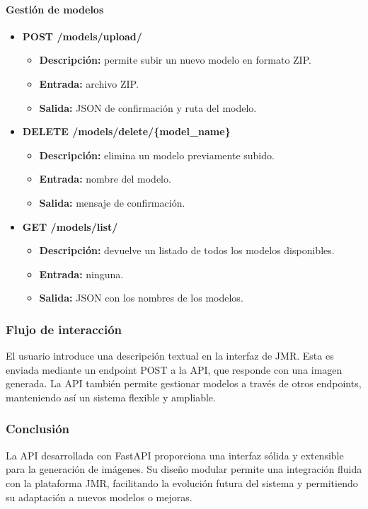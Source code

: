 \paragraph{Gestión de modelos}
\begin{itemize}
    \item \textbf{POST /models/upload/}
    \begin{itemize}
        \item \textbf{Descripción:} permite subir un nuevo modelo en formato ZIP.
        \item \textbf{Entrada:} archivo ZIP.
        \item \textbf{Salida:} JSON de confirmación y ruta del modelo.
    \end{itemize}

    \item \textbf{DELETE /models/delete/\{model\_name\}}
    \begin{itemize}
        \item \textbf{Descripción:} elimina un modelo previamente subido.
        \item \textbf{Entrada:} nombre del modelo.
        \item \textbf{Salida:} mensaje de confirmación.
    \end{itemize}

    \item \textbf{GET /models/list/}
    \begin{itemize}
        \item \textbf{Descripción:} devuelve un listado de todos los modelos disponibles.
        \item \textbf{Entrada:} ninguna.
        \item \textbf{Salida:} JSON con los nombres de los modelos.
    \end{itemize}
\end{itemize}

\subsubsection{Flujo de interacción}
El usuario introduce una descripción textual en la interfaz de JMR. Esta es enviada mediante un endpoint POST a la API, que responde con una imagen generada. La API también permite gestionar modelos a través de otros endpoints, manteniendo así un sistema flexible y ampliable.

\subsubsection{Conclusión}
La API desarrollada con FastAPI proporciona una interfaz sólida y extensible para la generación de imágenes. Su diseño modular permite una integración fluida con la plataforma JMR, facilitando la evolución futura del sistema y permitiendo su adaptación a nuevos modelos o mejoras.
